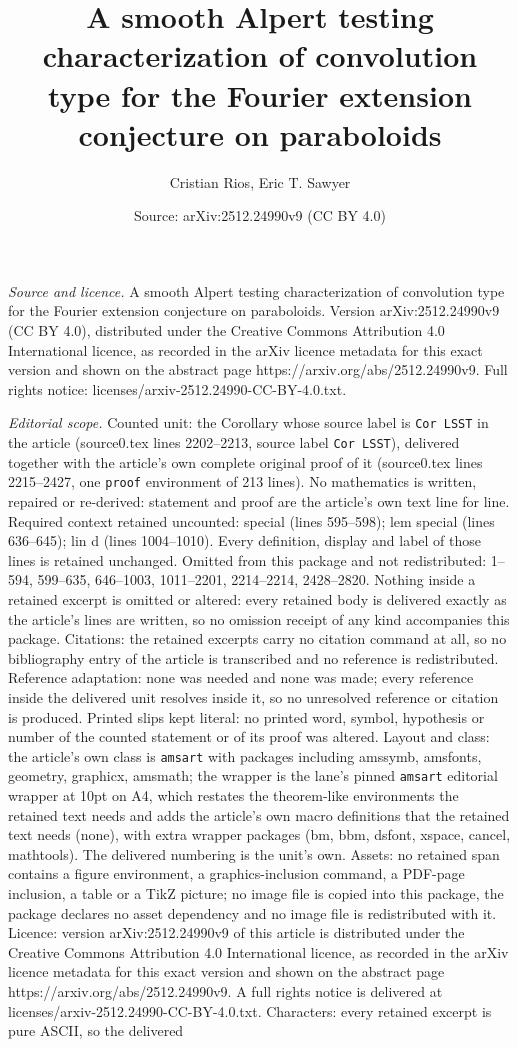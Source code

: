\documentclass[10pt,a4paper]{amsart}
\title[A smooth Alpert testing characterization of convolution type]{A smooth Alpert testing characterization of convolution type for the Fourier extension conjecture on paraboloids}
\author{Cristian Rios, Eric T. Sawyer}
\date{Source: arXiv:2512.24990v9 (CC BY 4.0)}
\begin{document}
\maketitle

\noindent\emph{Source and licence.} A smooth Alpert testing characterization of convolution type for the Fourier extension conjecture on paraboloids. Version arXiv:2512.24990v9 (CC BY 4.0), distributed under the Creative Commons Attribution 4.0 International licence, as recorded in the arXiv licence metadata for this exact version and shown on the abstract page https://arxiv.org/abs/2512.24990v9. Full rights notice: licenses/arxiv-2512.24990-CC-BY-4.0.txt.\par\smallskip

\noindent\textit{Editorial scope.} Counted unit: the Corollary whose source label is \texttt{Cor LSST} in the article (source0.tex lines 2202--2213, source label \texttt{Cor LSST}), delivered together with the article's own complete original proof of it (source0.tex lines 2215--2427, one \texttt{proof} environment of 213 lines). No mathematics is written, repaired or re-derived: statement and proof are the article's own text line for line. Required context retained uncounted: special (lines 595--598); lem special (lines 636--645); lin d (lines 1004--1010). Every definition, display and label of those lines is retained unchanged. Omitted from this package and not redistributed: 1--594, 599--635, 646--1003, 1011--2201, 2214--2214, 2428--2820. Nothing inside a retained excerpt is omitted or altered: every retained body is delivered exactly as the article's lines are written, so no omission receipt of any kind accompanies this package. Citations: the retained excerpts carry no citation command at all, so no bibliography entry of the article is transcribed and no reference is redistributed. Reference adaptation: none was needed and none was made; every reference inside the delivered unit resolves inside it, so no unresolved reference or citation is produced. Printed slips kept literal: no printed word, symbol, hypothesis or number of the counted statement or of its proof was altered. Layout and class: the article's own class is \texttt{amsart} with packages including amssymb, amsfonts, geometry, graphicx, amsmath; the wrapper is the lane's pinned \texttt{amsart} editorial wrapper at 10pt on A4, which restates the theorem-like environments the retained text needs and adds the article's own macro definitions that the retained text needs (none), with extra wrapper packages (bm, bbm, dsfont, xspace, cancel, mathtools). The delivered numbering is the unit's own. Assets: no retained span contains a figure environment, a graphics-inclusion command, a PDF-page inclusion, a table or a TikZ picture; no image file is copied into this package, the package declares no asset dependency and no image file is redistributed with it. Licence: version arXiv:2512.24990v9 of this article is distributed under the Creative Commons Attribution 4.0 International licence, as recorded in the arXiv licence metadata for this exact version and shown on the abstract page https://arxiv.org/abs/2512.24990v9. A full rights notice is delivered at licenses/arxiv-2512.24990-CC-BY-4.0.txt. Characters: every retained excerpt is pure ASCII, so the delivered 
\end{document}
